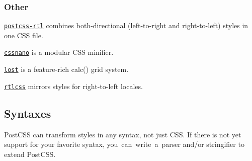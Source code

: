 \subsubsection*{Other}


\begin{DoxyItemize}
\item \href{https://github.com/vkalinichev/postcss-rtl}{\tt {\ttfamily postcss-\/rtl}} combines both-\/directional (left-\/to-\/right and right-\/to-\/left) styles in one C\+SS file.
\item \href{http://cssnano.co}{\tt {\ttfamily cssnano}} is a modular C\+SS minifier.
\item \href{https://github.com/peterramsing/lost}{\tt {\ttfamily lost}} is a feature-\/rich {\ttfamily calc()} grid system.
\item \href{https://github.com/MohammadYounes/rtlcss}{\tt {\ttfamily rtlcss}} mirrors styles for right-\/to-\/left locales.
\end{DoxyItemize}

\subsection*{Syntaxes}

Post\+C\+SS can transform styles in any syntax, not just C\+SS. If there is not yet support for your favorite syntax, you can write a parser and/or stringifier to extend Post\+C\+SS.


